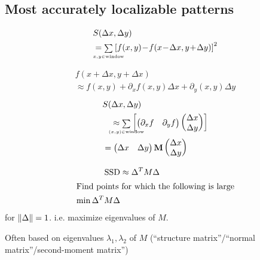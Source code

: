 \subsection{Most accurately localizable patterns}
\begin{compactdesc}
\item[\lp{Local displacement sensitivity}] 
	\begin{align*}
		&S(\Delta x,\Delta y) \\
		&={\scriptstyle\sum\limits_{\mathclap{x,y\in \text{window}}}}^{}\left[ f(x,y)\!-\!f(x\!-\!\Delta x,y\!+\!\Delta y) \right]^2
	\end{align*}
\item[\lp{Linear approximation for small $\Delta x,\Delta y$}]
	\begin{multline*}
		f(x+\Delta x,y+\Delta x)\\\approx f(x,y)+\partial_x f(x,y)\Delta x+\partial_y(x,y)\Delta y
	\end{multline*}
	\begin{align*}
		&S(\Delta x,\Delta y)\\
		&\quad\approx{\scriptstyle\sum\limits_{\mathclap{(x,y)\in\text{window}}}}^{}
		\left[
		\begin{pmatrix}
			\partial_x f&\partial_y f
		\end{pmatrix}
		\begin{pmatrix}
			\Delta x\\
			\Delta y
		\end{pmatrix}
		\right]\\
		&=
		\begin{pmatrix}
			\Delta x&\Delta y
		\end{pmatrix}
		\vtr{M}
		\begin{pmatrix}
			\Delta x\\
			\Delta y
		\end{pmatrix}
	\end{align*}
	\item[\lp{Feature point extraction}]
		\begin{align*}
			\text{SSD}&\approx\Delta^{T}M\Delta\\
			\shortintertext{Find points for which the following is large}
			\min \Delta^{T}M\Delta
		\end{align*}
		for $\left\lVert \Delta \right\rVert=1$. i.e. maximize eigenvalues of $M$.
	\item[\lp{Keypoint detection}]
		Often based on eigenvalues $\lambda_1,\lambda_2$ of $M$ (``structure matrix''/``normal matrix''/second-moment matrix'')
		\begin{gather*}

\end{gather*}
\end{compactdesc}
